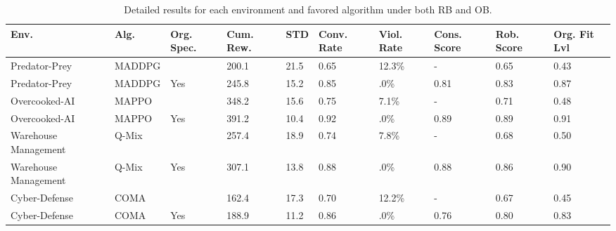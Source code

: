 \documentclass[sigconf]{aamas}
\begin{document}
\begin{table}[h!]
  \centering
  \caption{Detailed results for each environment and favored algorithm under both RB and OB.}
  \label{tab:detailed_results}
  \small
  \renewcommand{\arraystretch}{1.2}
  \begin{tabular}{p{3.5cm}p{1.5cm}p{}p{1.3cm}p{1cm}p{1.3cm}p{1.3cm}p{1.2cm}p{1.2cm}p{1cm}}
    \hline
    \textbf{Env.}        & \textbf{Alg.} & \textbf{Org. Spec.} & \textbf{Cum. Rew.} & \textbf{STD} & \textbf{Conv. Rate} & \textbf{Viol. Rate} & \textbf{Cons. Score} & \textbf{Rob. Score} & \textbf{Org. Fit Lvl} \\ \hline
    Predator-Prey        & MADDPG        &                     & 200.1              & 21.5         & 0.65                & 12.3\%              & -                    & 0.65                & 0.43                  \\
    Predator-Prey        & MADDPG        & Yes                 & 245.8              & 15.2         & 0.85                & .0\%                & 0.81                 & 0.83                & 0.87                  \\
    Overcooked-AI        & MAPPO         &                     & 348.2              & 15.6         & 0.75                & 7.1\%               & -                    & 0.71                & 0.48                  \\
    Overcooked-AI        & MAPPO         & Yes                 & 391.2              & 10.4         & 0.92                & .0\%                & 0.89                 & 0.89                & 0.91                  \\
    Warehouse Management & Q-Mix         &                     & 257.4              & 18.9         & 0.74                & 7.8\%               & -                    & 0.68                & 0.50                  \\
    Warehouse Management & Q-Mix         & Yes                 & 307.1              & 13.8         & 0.88                & .0\%                & 0.88                 & 0.86                & 0.90                  \\
    Cyber-Defense        & COMA          &                     & 162.4              & 17.3         & 0.70                & 12.2\%              & -                    & 0.67                & 0.45                  \\
    Cyber-Defense        & COMA          & Yes                 & 188.9              & 11.2         & 0.86                & .0\%                & 0.76                 & 0.80                & 0.83                  \\ \hline
  \end{tabular}
\end{table}
\end{document}
